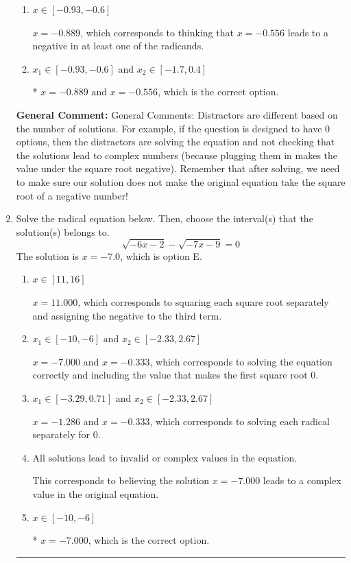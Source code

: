 \documentclass{extbook}[14pt]
\newcommand{\litem}[1]{\item #1

\rule{\textwidth}{0.4pt}}
\begin{document}
\begin{enumerate}
{\begin{enumerate}[label=\Alph*.]
Corresponds to thinking that $x = -0.889 \text{ and } x = -0.556$ lead to negatives in at least one of the radicands.
\item \( x \in [-0.93,-0.6] \)

$x = -0.889$, which corresponds to thinking that $x = -0.556$ leads to a negative in at least one of the radicands.
\item \( x_1 \in [-0.93, -0.6] \text{ and } x_2 \in [-1.7,0.4] \)

* $x = -0.889 \text{ and } x = -0.556$, which is the correct option.
\end{enumerate}

\textbf{General Comment:} General Comments: Distractors are different based on the number of solutions. For example, if the question is designed to have 0 options, then the distractors are solving the equation and not checking that the solutions lead to complex numbers (because plugging them in makes the value under the square root negative). Remember that after solving, we need to make sure our solution does not make the original equation take the square root of a negative number!
}
\litem{
Solve the radical equation below. Then, choose the interval(s) that the solution(s) belongs to.
\[ \sqrt{-6 x - 2} - \sqrt{-7 x - 9} = 0 \]
The solution is \( x = -7.0 \), which is option E.\begin{enumerate}[label=\Alph*.]
\item \( x \in [11,16] \)

$x = 11.000$, which corresponds to squaring each square root separately and assigning the negative to the third term.
\item \( x_1 \in [-10, -6] \text{ and } x_2 \in [-2.33,2.67] \)

$x = -7.000$ and $x = -0.333$, which corresponds to solving the equation correctly and including the value that makes the first square root 0.
\item \( x_1 \in [-3.29, 0.71] \text{ and } x_2 \in [-2.33,2.67] \)

$x = -1.286$ and $x = -0.333$, which corresponds to solving each radical separately for 0.
\item \( \text{All solutions lead to invalid or complex values in the equation.} \)

This corresponds to believing the solution $x = -7.000$ leads to a complex value in the original equation.
\item \( x \in [-10,-6] \)

* $x = -7.000$, which is the correct option.
\end{enumerate}

}
\end{enumerate}
\end{document}
